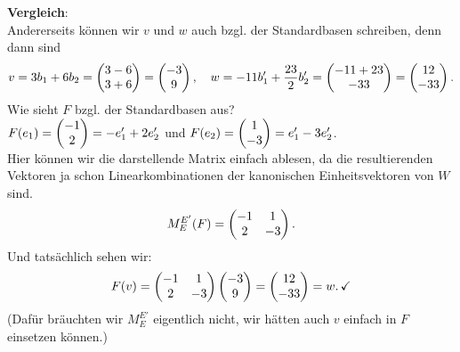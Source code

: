 \begin{Beispiel}
\begin{center}
\end{center}
\textbf{Vergleich}:\\
Andererseits können wir $v$ und $w$ auch bzgl. der Standardbasen schreiben, denn dann sind
\begin{equation*}
    v=3b_1+6b_2=\begin{pmatrix}3-6\\3+6\end{pmatrix}=\begin{pmatrix}-3\\9\end{pmatrix},\quad w=-11b_1'+\frac{23}{2}b_2'=\begin{pmatrix}-11+23\\-33\end{pmatrix}=\begin{pmatrix}12\\-33\end{pmatrix}.
\end{equation*}
Wie sieht $F$ bzgl. der Standardbasen aus?\\ $F(e_1)=\begin{pmatrix}-1\\2\end{pmatrix}=-e_1'+2e_2'$ und $F(e_2)=\begin{pmatrix}1\\-3\end{pmatrix}=e_1'-3e_2'$.\\
Hier können wir die darstellende Matrix einfach ablesen, da die resultierenden Vektoren ja schon Linearkombinationen der kanonischen Einheitsvektoren von $W$ sind.
\begin{equation*}
    M_E^{E'}(F)=\begin{pmatrix}-1&1\\2 &-3\end{pmatrix}.
\end{equation*}
Und tatsächlich sehen wir:
\begin{equation*}
    F(v)=\begin{pmatrix}-1&1\\2 &-3\end{pmatrix}\begin{pmatrix}-3\\9\end{pmatrix}=\begin{pmatrix}12\\-33\end{pmatrix}=w.\,\checkmark
\end{equation*}
(Dafür bräuchten wir $M_E^{E'}$ eigentlich nicht, wir hätten auch $v$ einfach in $F$ einsetzen können.)
\end{Beispiel}

